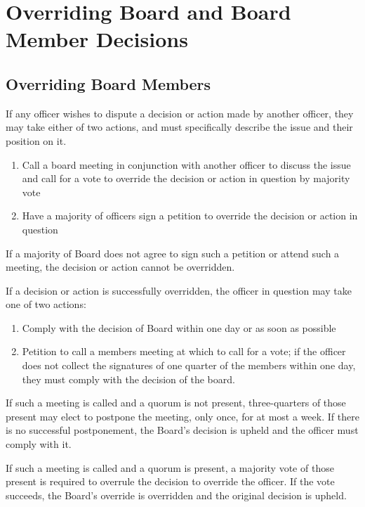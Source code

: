 \section {Overriding Board and Board Member Decisions}
\label{sec:overriding-board-decisions}



\subsection{Overriding Board Members}

If any officer wishes to dispute a decision or action made by another officer, they may take either of two actions, and must specifically describe the issue and their position on it.
\begin{enumerate}
	\item Call a board meeting in conjunction with another officer to discuss the issue and call for a vote to override the decision or action in question by majority vote
	\item Have a majority of officers sign a petition to override the decision or action in question
\end{enumerate}
If a majority of Board does not agree to sign such a petition or attend such a meeting, the decision or action cannot be overridden.

If a decision or action is successfully overridden, the officer in question may take one of two actions:
\begin{enumerate}
	\item Comply with the decision of Board within one day or as soon as possible
	\item Petition to call a members meeting at which to call for a vote; if the officer does not collect the signatures of one quarter of the members within one day, they must comply with the decision of the board.
\end{enumerate}
If such a meeting is called and a quorum is not present, three-quarters of those present may elect to postpone the meeting, only once, for at most a week. If there is no successful postponement, the Board's decision is upheld and the officer must comply with it.

If such a meeting is called and a quorum is present, a majority vote of those present is required to overrule the decision to override the officer. If the vote succeeds, the Board's override is overridden and the original decision is upheld.



